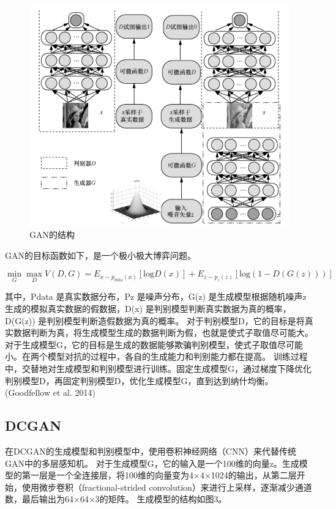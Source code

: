 \documentclass[hyperref, a4paper]{ctexart}
\begin{document}
\begin{figure}
\centering
\includegraphics{1.png}
\caption{GAN的结构}
\end{figure}

GAN的目标函数如下，是一个极小极大博弈问题。

\[\mathop{\min}\limits_{G} \mathop{\max}\limits_{D}\mathit{V(D,G)} = E_{x\sim p_{data}(x)}[ \mathrm{log} D(x)]+E_{z\sim p_z(z)}[ \mathrm{log}(1-D(G(z)))]\]

其中，Pdata 是真实数据分布，Pz 是噪声分布，G(z) 是生成模型根据随机噪声z
生成的模拟真实数据的假数据，D(x)
是判别模型判断真实数据为真的概率，D(G(z))
是判别模型判断造假数据为真的概率。
对于判别模型D，它的目标是将真实数据判断为真，将生成模型生成的数据判断为假，也就是使式子取值尽可能大。对于生成模型G，它的目标是生成的数据能够欺骗判别模型，使式子取值尽可能小。在两个模型对抗的过程中，各自的生成能力和判别能力都在提高。
训练过程中，交替地对生成模型和判别模型进行训练。固定生成模型G，通过梯度下降优化判别模型D，再固定判别模型D，优化生成模型G，直到达到纳什均衡。(Goodfellow
et al. 2014)

\hypertarget{dcgan}{%
\subsection{DCGAN}\label{dcgan}}

在DCGAN的生成模型和判别模型中，使用卷积神经网络（CNN）来代替传统GAN中的多层感知机。
对于生成模型G，它的输入是一个100维的向量z。生成模型的第一层是一个全连接层，将100维的向量变为4×4×1024的输出，从第二层开始，使用微步卷积（fractional-strided
convolution）来进行上采样，逐渐减少通道数，最后输出为64×64×3的矩阵。
生成模型的结构如图3。
\end{document}
